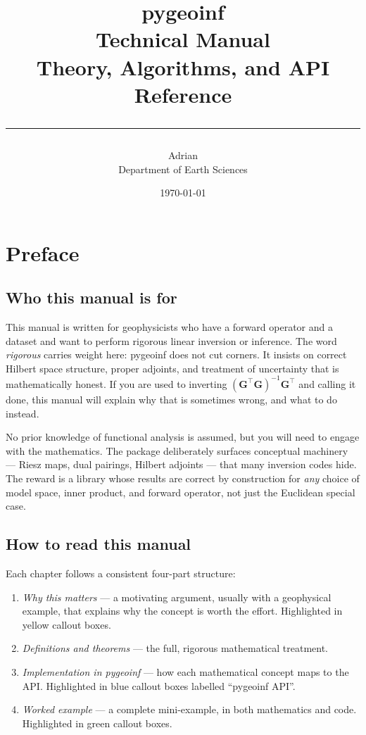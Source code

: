 \documentclass[11pt,twoside,openright]{book}
\title{%
  \vspace{-2cm}
  {\Huge\bfseries pygeoinf}\\[0.8em]
  {\LARGE Technical Manual}\\[0.4em]
  {\Large Theory, Algorithms, and API Reference}\\[2em]
  \rule{\textwidth}{0.8pt}
}
\author{%
  Adrian\\[0.5em]
  {\normalsize Department of Earth Sciences}
}
\date{\today}
\theoremstyle{plain}
\theoremstyle{definition}
\theoremstyle{remark}
\begin{document}

\frontmatter

\maketitle

\chapter{Preface}

\section*{Who this manual is for}

This manual is written for geophysicists who have a forward operator and
a dataset and want to perform rigorous linear inversion or inference. The
word \emph{rigorous} carries weight here: pygeoinf does not cut corners.
It insists on correct Hilbert space structure, proper adjoints, and
treatment of uncertainty that is mathematically honest. If you are used
to inverting $( \mathbf{G}^\top \mathbf{G})^{-1}\mathbf{G}^\top$
and calling it done, this manual will explain why that is sometimes
wrong, and what to do instead.

No prior knowledge of functional analysis is assumed, but you will need
to engage with the mathematics. The package deliberately surfaces
conceptual machinery --- Riesz maps, dual pairings, Hilbert adjoints ---
that many inversion codes hide. The reward is a library whose results are
correct by construction for \emph{any} choice of model space, inner
product, and forward operator, not just the Euclidean special case.

\section*{How to read this manual}

Each chapter follows a consistent four-part structure:
\begin{enumerate}
  \item \emph{Why this matters} --- a motivating argument, usually with a
    geophysical example, that explains why the concept is worth the
    effort. Highlighted in yellow callout boxes.
  \item \emph{Definitions and theorems} --- the full, rigorous mathematical
    treatment.
  \item \emph{Implementation in pygeoinf} --- how each mathematical concept
    maps to the API. Highlighted in blue callout boxes labelled
    ``pygeoinf API''.
  \item \emph{Worked example} --- a complete mini-example, in both
    mathematics and code. Highlighted in green callout boxes.
\end{enumerate}
\end{document}
